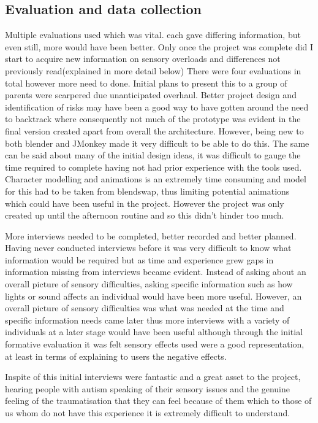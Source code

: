 \subsection{Evaluation and data collection}
Multiple evaluations used which was vital. each gave differing information, but even still, more would have been better. Only once the project was complete did I start to acquire new information on sensory overloads and differences not previously read(explained in more detail below)
There were four evaluations in total however more need to done. Initial plans to present this to a group of parents were scarpered due unanticipated overhaul.
Better project design and identification of risks may have been a good way to have gotten around the need to backtrack where consequently not much of the prototype was evident in the final version created apart from overall the architecture. However, being new to both blender and JMonkey made it very difficult to be able to do this. The same can be said about many of the initial design ideas, it was difficult to gauge the time required to complete having not had prior experience with the tools used. Character modelling and animations is an extremely time consuming and model for this had to be taken from blendswap, thus limiting potential animations which could have been useful in the project. However the project was only created up until the afternoon routine and so this didn't hinder too much.

More interviews needed to be completed, better recorded and better planned. Having never conducted interviews before it was very difficult to know what information would be required but as time and experience grew gaps in information missing from interviews became evident. Instead of asking about an overall picture of sensory difficulties, asking specific information such as how lights or sound affects an individual would have been more useful. However, an overall picture of sensory difficulties was what was needed at the time and specific information needs came later thus more interviews with a variety of individuals at a later stage would have been useful although through the initial formative evaluation it was felt sensory effects used were a good representation, at least in terms of explaining to users the negative effects. 

Inspite of this initial interviews were fantastic and a great asset to the project, hearing people with autism speaking of their sensory issues and the genuine feeling of the traumatisation that they can feel because of them which to those of us whom do not have this experience it is extremely difficult to understand. 

